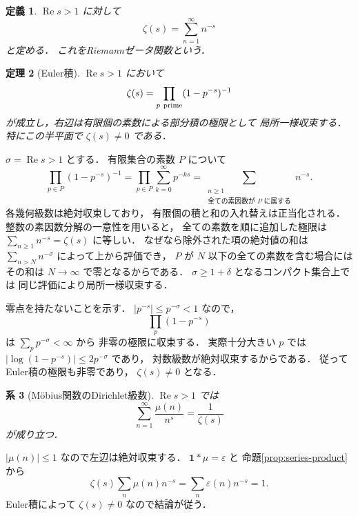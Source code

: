 \documentclass[a5paper,10pt,onecolumn]{jsarticle}
\makeatletter
\theoremstyle{mathnotetheorem}
\newtheorem{theorem}{定理}[section]
\newtheorem{definition}[theorem]{定義}
\newtheorem{corollary}[theorem]{系}
\renewcommand{\proofname}{証明}
\renewenvironment{proof}[1][\proofname]{%
  \par\pushQED{\qed}\normalfont\topsep4\p@\@plus2\p@\relax
  \trivlist\item[\hskip\labelsep\bfseries #1]\ignorespaces
}{\popQED\endtrivlist\@endpefalse}
\makeatother
\begin{document}
\begin{definition}
$\operatorname{Re}s>1$ に対して
\[
 \zeta(s)=\sum_{n=1}^\infty n^{-s}
\]
と定める．
これをRiemannゼータ関数という．
\end{definition}

\begin{theorem}[Euler積]\label{thm:euler-product}
$\operatorname{Re}s>1$ において
\[
 \zeta(s)=\prod_{p\ {\rm prime}}(1-p^{-s})^{-1}
\]
が成立し，右辺は有限個の素数による部分積の極限として
局所一様収束する．
特にこの半平面で $\zeta(s)\ne0$ である．
\end{theorem}
\begin{proof}
$\sigma=\operatorname{Re}s>1$ とする．
有限集合の素数 $P$ について
\[
 \prod_{p\in P}(1-p^{-s})^{-1}
 =\prod_{p\in P}\sum_{k=0}^\infty p^{-ks}
 =\sum_{\substack{n\ge1\\
   \text{全ての素因数が }P\text{ に属する}}}n^{-s}.
\]
各幾何級数は絶対収束しており，
有限個の積と和の入れ替えは正当化される．
整数の素因数分解の一意性を用いると，
全ての素数を順に追加した極限は
$\sum_{n\ge1}n^{-s}=\zeta(s)$ に等しい．
なぜなら除外された項の絶対値の和は
$\sum_{n>N}n^{-\sigma}$ によって上から評価でき，
$P$ が $N$ 以下の全ての素数を含む場合には
その和は $N\to\infty$ で零となるからである．
$\sigma\ge1+\delta$ となるコンパクト集合上では
同じ評価により局所一様収束する．

零点を持たないことを示す．
$|p^{-s}|\le p^{-\sigma}<1$ なので，
\[
 \prod_p(1-p^{-s})
\]
は $\sum_pp^{-\sigma}<\infty$ から
非零の極限に収束する．
実際十分大きい $p$ では
$|\log(1-p^{-s})|\le2p^{-\sigma}$ であり，
対数級数が絶対収束するからである．
従ってEuler積の極限も非零であり，
$\zeta(s)\ne0$ となる．
\end{proof}

\begin{corollary}[M\"obius関数のDirichlet級数]
\label{cor:mu-dirichlet}
$\operatorname{Re}s>1$ では
\[
 \sum_{n=1}^\infty\frac{\mu(n)}{n^s}
 =\frac1{\zeta(s)}
\]
が成り立つ．
\end{corollary}
\begin{proof}
$|\mu(n)|\le1$ なので左辺は絶対収束する．
$\mathbf1*\mu=\varepsilon$ と
命題\ref{prop:series-product}から
\[
 \zeta(s)\sum_n\mu(n)n^{-s}
 =\sum_n\varepsilon(n)n^{-s}=1.
\]
Euler積によって $\zeta(s)\ne0$ なので結論が従う．
\end{proof}
\end{document}
